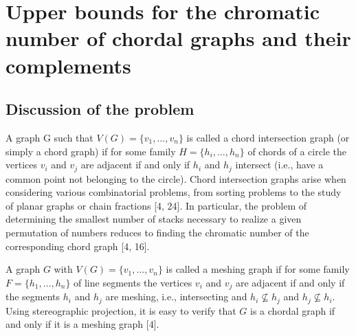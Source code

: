 \documentclass{article}
\begin{document}
    \section{Upper bounds for the chromatic number
    of chordal graphs and their complements}

    \subsection{Discussion of the problem}

    A graph G such that
    $V(G)=\{v_1,\ldots, v_n\}$ is called 
    a chord intersection graph
    (or simply a chord graph) 
    if for some family $H = \{h_{i}, \ldots, h_{n}\}$
    of chords of a circle the 
    vertices $v_{i}$ and $v_{j}$
    are adjacent if and only if 
    $h_{i}$ and $h_{j}$ 
    intersect (i.e., have a common point
    not belonging to the circle). 
    Chord intersection graphs arise 
    when considering various
    combinatorial problems,
    from sorting problems to 
    the study of planar graphs
    or chain fractions [4, 24].
    In particular, the problem 
    of determining the smallest
    number of stacks necessary to
    realize a given permutation 
    of numbers reduces to finding 
    the chromatic number of 
    the corresponding chord graph [4, 16].

    A graph $G$ with $V(G) = \{v_{1}, \ldots, v_{n}\}$
    is called a meshing graph if 
    for some family $F = \{h_1, \ldots, h_n\}$ 
    of line segments the vertices 
    $v_{i}$ and $v_{j}$ are adjacent 
    if and only if the segments 
    $h_{i}$ and $h_{j}$ are meshing, 
    i.e., intersecting and $h_{i} \not \subseteq  h_{j}$
    and $h_{j} \not \subseteq h_{i}$.  
    Using stereographic projection, 
    it is easy to verify that $G$ is a chordal graph
    if and only if it is a meshing graph [4].
\end{document}
